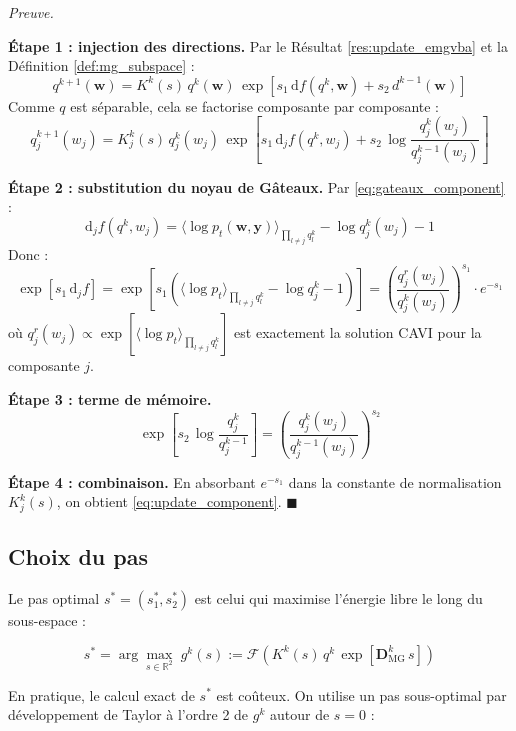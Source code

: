 \documentclass[12pt]{article}
\newcommand{\w}{\boldsymbol{w}}
\newcommand{\y}{\boldsymbol{y}}
\renewcommand{\qedsymbol}{$\blacksquare$}
\renewenvironment{proof}[1][\proofname]{%
  \par\medskip\noindent
  \textit{\color{proofgray}#1.}\enspace\ignorespaces
}{\hfill\qedsymbol\par\medskip}
\renewcommand{\proofname}{Preuve}
\begin{document}
\begin{proof}


\textbf{Étape 1 : injection des directions.} Par le Résultat 
\ref{res:update_emgvba} et la Définition 
\ref{def:mg_subspace} 
:
\[
q^{k+1}(\w) = K^k(s)\, q^k(\w)\, \exp\!\left[s_1\, \mathrm{d}f(q^k, \w) + s_2\, d^{k-1}(\w)\right]
\]
Comme $q$ est séparable, cela se factorise composante par composante 
:
\[
q_j^{k+1}(w_j) = K_j^k(s)\, q_j^k(w_j)\, \exp\!\left[s_1\, \mathrm{d}_j f(q^k, w_j) + s_2\, \log\frac{q_j^k(w_j)}{q_j^{k-1}(w_j)}\right]
\]

\textbf{Étape 2 : substitution du noyau de Gâteaux.} Par \eqref{eq:gateaux_component} 
:
\[
\mathrm{d}_j f(q^k, w_j) = \langle \log p_t(\w, \y) \rangle_{\prod_{l \neq j} q_l^k} - \log q_j^k(w_j) - 1
\]
Donc 
:
\[
\exp\!\left[s_1\, \mathrm{d}_j f\right] = \exp\!\left[s_1\left(\langle \log p_t \rangle_{\prod_{l \neq j} q_l^k} - \log q_j^k - 1\right)\right] = \left(\frac{q_j^r(w_j)}{q_j^k(w_j)}\right)^{s_1} \cdot e^{-s_1}
\]
où $q_j^r(w_j) \propto \exp[\langle \log p_t \rangle_{\prod_{l \neq j} q_l^k}]$ est exactement la solution CAVI pour la composante $j$.

\textbf{Étape 3 : terme de mémoire.}
\[
\exp\!\left[s_2\, \log\frac{q_j^k}{q_j^{k-1}}\right] = \left(\frac{q_j^k(w_j)}{q_j^{k-1}(w_j)}\right)^{s_2}
\]

\textbf{Étape 4 : combinaison.} En absorbant $e^{-s_1}$ dans la constante de normalisation $K_j^k(s)$, on obtient \eqref{eq:update_component}.
\end{proof}



\subsection{Choix du pas}

Le pas optimal $s^* = (s_1^*, s_2^*)$ est celui qui maximise l'énergie libre le long du sous-espace 
:

\begin{definitionbox}
\label{def:linesearch}
\begin{equation}
    s^* = \arg\max_{s \in \mathbb{R}^2}\; g^k(s) := \mathcal{F}\!\left(K^k(s)\, q^k\, \exp\!\left[\boldsymbol{D}^k_{\mathrm{MG}}\, s\right]\right)
\end{equation}
\end{definitionbox}

En pratique, le calcul exact de $s^*$ est coûteux. On utilise un pas sous-optimal par développement de Taylor à l'ordre 2 de $g^k$ autour de $s = 0$ :
\end{document}
